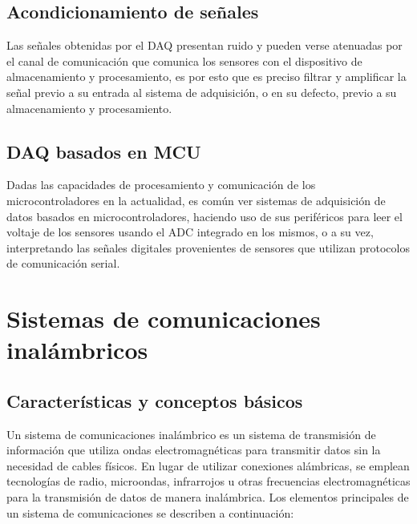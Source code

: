 \subsection{Acondicionamiento de señales} Las señales obtenidas por el DAQ presentan ruido y pueden verse atenuadas por el canal de comunicación que comunica los sensores con el dispositivo de almacenamiento y procesamiento, es por esto que es preciso filtrar y amplificar la señal previo a su entrada al sistema de adquisición, o en su defecto, previo a su almacenamiento y procesamiento.

\subsection{DAQ basados en MCU} Dadas las capacidades de procesamiento y comunicación de los microcontroladores en la actualidad, es común ver sistemas de adquisición de datos basados en microcontroladores, haciendo uso de sus periféricos para leer el voltaje de los sensores usando el ADC integrado en los mismos, o a su vez, interpretando las señales digitales provenientes de sensores que utilizan protocolos de comunicación serial.


\section{Sistemas de comunicaciones inalámbricos}

\subsection{Características y conceptos básicos}

Un sistema de comunicaciones inalámbrico es un sistema de transmisión de información que utiliza ondas electromagnéticas para transmitir datos sin la necesidad de cables físicos. En lugar de utilizar conexiones alámbricas, se emplean tecnologías de radio, microondas, infrarrojos u otras frecuencias electromagnéticas para la transmisión de datos de manera inalámbrica. Los elementos principales de un sistema de comunicaciones se describen a continuación:

